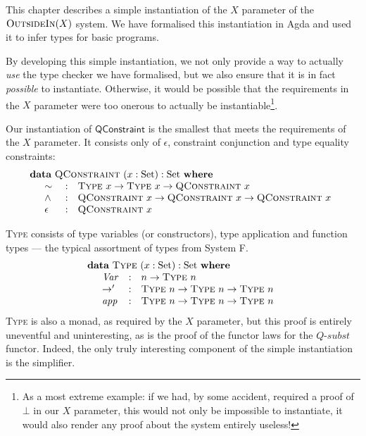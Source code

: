 \documentclass[a4paper]{jfp}
\newcommand{\outsidein}{\textsc{OutsideIn}(X)}
\begin{document}
This chapter describes a simple instantiation of the $X$ parameter of the $\outsidein$ system. We have formalised this instantiation in Agda and used
it to infer types for basic programs.

By developing this simple instantiation, we not only provide a way to actually \emph{use} the type checker we have formalised, but we also ensure that
it is in fact \emph{possible} to instantiate. Otherwise, it would be possible that the requirements in the $X$ parameter were too onerous to actually be
instantiable\footnote{As a most extreme example: if we had, by some accident, required a proof of $\bot$ in our $X$ parameter, this would not only be 
   impossible to instantiate, it would also render any proof about the system entirely useless!}.  

Our instantiation of $\textsf{QConstraint}$ is the smallest that meets the requirements of the $X$ parameter. It consists only of $\epsilon$,
constraint conjunction and type equality constraints:
\begin{displaymath}
   \begin{array}{l}
      \textbf{data}\ \textsc{QConstraint}\ (x : \text{Set}) : \text{Set}\ \textbf{where} \\
      \quad \begin{array}{lll}
      \sim\ & : & \textsc{Type}\ x \rightarrow \textsc{Type}\ x \rightarrow \textsc{QConstraint}\ x \\ 
      \land & : & \textsc{QConstraint}\ x \rightarrow \textsc{QConstraint}\ x \rightarrow \textsc{QConstraint}\ x  \\
      \epsilon\ & : & \textsc{QConstraint}\ x
      \end{array}
   \end{array}
\end{displaymath}

\textsc{Type} consists of type variables (or constructors), type application and function types --- the typical assortment of types from System F.
\begin{displaymath}
   \begin{array}{l}
      \textbf{data}\ \textsc{Type}\ (x : \text{Set}) : \text{Set}\ \textbf{where} \\
      \quad \begin{array}{lll}
        \mathit{Var} & : &  n \rightarrow \textsc{Type}\ n \\
        \rightarrow' & : &  \textsc{Type}\ n \rightarrow \textsc{Type}\ n \rightarrow \textsc{Type}\ n \\
        \mathit{app} & : &  \textsc{Type}\ n \rightarrow \textsc{Type}\ n \rightarrow \textsc{Type}\ n \\
         \end{array}
   \end{array}
\end{displaymath}
\textsc{Type} is also a monad, as required by the $X$ parameter, but this proof is entirely uneventful and uninteresting, as is the proof of the
functor laws for the $\textit{Q-subst}$ functor. Indeed, the only truly interesting component of the simple instantiation is the simplifier.
\end{document}
